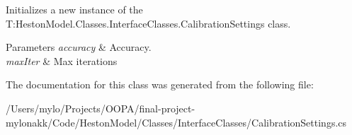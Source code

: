 Initializes a new instance of the T\+:\+Heston\+Model.\+Classes.\+Interface\+Classes.\+Calibration\+Settings class. 


\begin{DoxyParams}{Parameters}
{\em accuracy} & Accuracy.\\
\hline
{\em max\+Iter} & Max iterations\\
\hline
\end{DoxyParams}


The documentation for this class was generated from the following file\+:\begin{DoxyCompactItemize}
\item 
/\+Users/mylo/\+Projects/\+O\+O\+P\+A/final-\/project-\/mylonakk/\+Code/\+Heston\+Model/\+Classes/\+Interface\+Classes/Calibration\+Settings.\+cs\end{DoxyCompactItemize}
